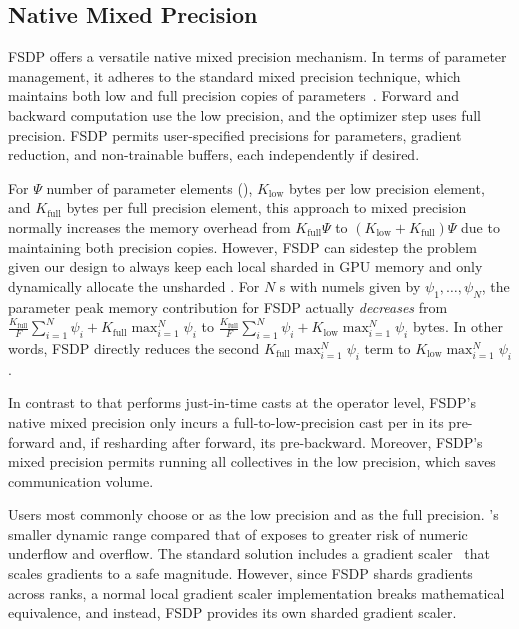 \subsection{Native Mixed Precision}
FSDP offers a versatile native mixed precision mechanism. In terms of parameter management, it adheres to the standard mixed precision technique, which maintains both low and full precision copies of parameters~\cite{micikevicius2017mixedprecision}. Forward and backward computation use the low precision, and the optimizer step uses full precision. FSDP permits user-specified precisions for parameters, gradient reduction, and non-trainable buffers, each independently if desired.

For $\Psi$ number of parameter elements (), $K_{\text{low}}$ bytes per low precision element, and $K_{\text{full}}$ bytes per full precision element, this approach to mixed precision normally increases the memory overhead from $K_{\text{full}}\Psi$ to $(K_{\text{low}} + K_{\text{full}})\Psi$ due to maintaining both precision copies. However, FSDP can sidestep the problem given our design to always keep each local sharded  in GPU memory and only dynamically allocate the unsharded . For $N$ s with numels given by $\psi_1, \dots, \psi_N$, the parameter peak memory contribution for FSDP actually \textit{decreases} from $\frac{K_{\text{full}}}{F}\sum_{i=1}^N \psi_i + K_{\text{full}} \max_{i=1}^N \psi_i$ to $\frac{K_{\text{full}}}{F}\sum_{i=1}^N \psi_i + K_{\text{low}} \max_{i=1}^N \psi_i$ bytes. In other words, FSDP directly reduces the second $K_{\text{full}} \max_{i=1}^N \psi_i$ term to $K_{\text{low}} \max_{i=1}^N \psi_i$.

In contrast to  that performs just-in-time casts at the operator level, FSDP's native mixed precision only incurs a full-to-low-precision cast per  in its pre-forward and, if resharding after forward, its pre-backward. Moreover, FSDP's mixed precision permits running all collectives in the low precision, which saves communication volume.


Users most commonly choose  or  as the low precision and  as the full precision. 's smaller dynamic range compared that of  exposes  to greater risk of numeric underflow and overflow. The standard solution includes a gradient scaler~\cite{AMPGradScaler} that scales gradients to a safe magnitude. However, since FSDP shards gradients across ranks, a normal local gradient scaler implementation breaks mathematical equivalence, and instead, FSDP provides its own sharded gradient scaler.